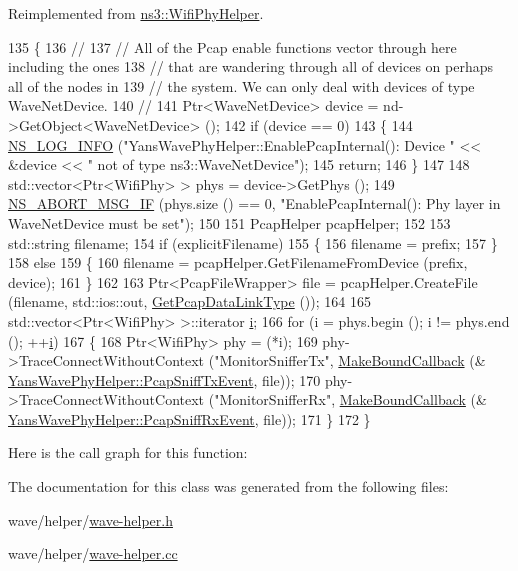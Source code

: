 Reimplemented from \hyperlink{classns3_1_1WifiPhyHelper_a1d0dc819ef2e257409b6b84924d07085}{ns3\+::\+Wifi\+Phy\+Helper}.


\begin{DoxyCode}
135 \{
136   \textcolor{comment}{//}
137   \textcolor{comment}{// All of the Pcap enable functions vector through here including the ones}
138   \textcolor{comment}{// that are wandering through all of devices on perhaps all of the nodes in}
139   \textcolor{comment}{// the system.  We can only deal with devices of type WaveNetDevice.}
140   \textcolor{comment}{//}
141   Ptr<WaveNetDevice> device = nd->GetObject<WaveNetDevice> ();
142   \textcolor{keywordflow}{if} (device == 0)
143     \{
144       \hyperlink{group__logging_gafbd73ee2cf9f26b319f49086d8e860fb}{NS\_LOG\_INFO} (\textcolor{stringliteral}{"YansWavePhyHelper::EnablePcapInternal(): Device "} << &device << \textcolor{stringliteral}{" not of
       type ns3::WaveNetDevice"});
145       \textcolor{keywordflow}{return};
146     \}
147 
148   std::vector<Ptr<WifiPhy> > phys = device->GetPhys ();
149   \hyperlink{group__fatal_ga6653324225bc139e46deea177614ceee}{NS\_ABORT\_MSG\_IF} (phys.size () == 0, \textcolor{stringliteral}{"EnablePcapInternal(): Phy layer in WaveNetDevice must
       be set"});
150 
151   PcapHelper pcapHelper;
152 
153   std::string filename;
154   \textcolor{keywordflow}{if} (explicitFilename)
155     \{
156       filename = prefix;
157     \}
158   \textcolor{keywordflow}{else}
159     \{
160       filename = pcapHelper.GetFilenameFromDevice (prefix, device);
161     \}
162 
163   Ptr<PcapFileWrapper> file = pcapHelper.CreateFile (filename, std::ios::out, 
      \hyperlink{classns3_1_1WifiPhyHelper_a1ac7d21ac3f931ccd18a31fa72e57dc2}{GetPcapDataLinkType} ());
164 
165   std::vector<Ptr<WifiPhy> >::iterator \hyperlink{bernuolliDistribution_8m_a6f6ccfcf58b31cb6412107d9d5281426}{i};
166   \textcolor{keywordflow}{for} (i = phys.begin (); i != phys.end (); ++\hyperlink{bernuolliDistribution_8m_a6f6ccfcf58b31cb6412107d9d5281426}{i})
167     \{
168       Ptr<WifiPhy> phy = (*i);
169       phy->TraceConnectWithoutContext (\textcolor{stringliteral}{"MonitorSnifferTx"}, \hyperlink{group__makeboundcallback_ga1725d6362e6065faa0709f7c93f8d770}{MakeBoundCallback} (&
      \hyperlink{classns3_1_1WifiPhyHelper_a24e075fa55e473c81f76a4178c0fcb25}{YansWavePhyHelper::PcapSniffTxEvent}, file));
170       phy->TraceConnectWithoutContext (\textcolor{stringliteral}{"MonitorSnifferRx"}, \hyperlink{group__makeboundcallback_ga1725d6362e6065faa0709f7c93f8d770}{MakeBoundCallback} (&
      \hyperlink{classns3_1_1WifiPhyHelper_ac5da2b1210868b0ae050e3adc54a9d2f}{YansWavePhyHelper::PcapSniffRxEvent}, file));
171     \}
172 \}
\end{DoxyCode}


Here is the call graph for this function\+:




The documentation for this class was generated from the following files\+:\begin{DoxyCompactItemize}
\item 
wave/helper/\hyperlink{wave-helper_8h}{wave-\/helper.\+h}\item 
wave/helper/\hyperlink{wave-helper_8cc}{wave-\/helper.\+cc}\end{DoxyCompactItemize}
